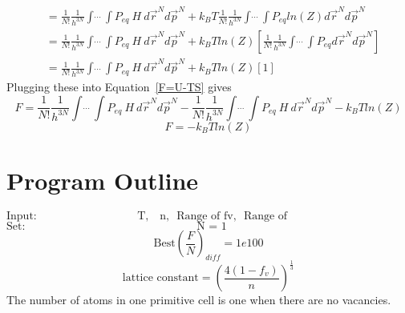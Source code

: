 \documentclass[double,12pt]{beavtex}
\begin{document}
\begin{align}  
    &= \frac{1}{N!}\frac{1}{h^{3N}}\int\dot~\dot~\dot~\int P_{eq}~H~d\vec r^{N} d\vec p^{N} +k_BT\frac{1}{N!}\frac{1}{h^{3N}}\int\dot~\dot~\dot~\int P_{eq}ln(Z)d\vec r^{N} d\vec p^{N}     \\
    &= \frac{1}{N!}\frac{1}{h^{3N}}\int\dot~\dot~\dot~\int P_{eq}~H~d\vec r^{N} d\vec p^{N} +k_BTln(Z)\left[\frac{1}{N!}\frac{1}{h^{3N}}\int\dot~\dot~\dot~\int P_{eq}d\vec r^{N} d\vec p^{N}\right]   \\
    &= \frac{1}{N!}\frac{1}{h^{3N}}\int\dot~\dot~\dot~\int P_{eq}~H~d\vec r^{N} d\vec p^{N} +k_BTln(Z)\left[1\right]   
\end{align}
Plugging these into Equation~\ref{F=U-TS} gives
\begin{equation} F = \frac{1}{N!}\frac{1}{h^{3N}}\int\dot~\dot~\dot~\int P_{eq}~H~d\vec r^{N} d\vec p^{N}-\frac{1}{N!}\frac{1}{h^{3N}}\int\dot~\dot~\dot~\int P_{eq}~H~d\vec r^{N} d\vec p^{N} -k_BTln(Z)\end{equation}
\begin{equation}F = -k_BTln(Z)\end{equation}


\section{Program Outline}

\begin{displaymath}\text{Input:~~~~~~~~~~~~~~~~~~~~~~~~~~~T,~~ n,~~Range of fv,~~Range of gw~~~~~~~~~~~~~~~~~~~~~~~~~~~~~~~~~~~}\end{displaymath} 
\begin{displaymath}\text{Set:~~~~~~~~~~~~~~~~~~~~~~~~~~~~~~~~~~~~~~~~~~~~~~N~=~1~~~~~~~~~~~~~~~~~~~~~~~~~~~~~~~~~~~~~~~~~~~~~~~~~~~~}\end{displaymath} 
\begin{displaymath}\text{Best}\left(\frac{F}{N}\right)_{diff}= 1e100\end{displaymath}
\begin{displaymath}\text{lattice constant}=\left(\frac{4(1-f_v)}{n}\right)^{\frac{1}{3}}\end{displaymath}
The number of atoms in one primitive cell is one when there are no vacancies. 
\end{document}
